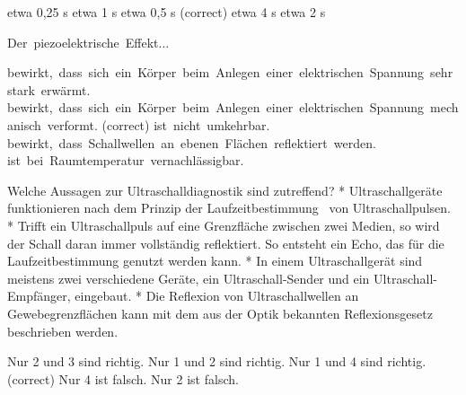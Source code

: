\documentclass[11pt]{exam}
\begin{document}
\begin{questions}
\begin{choices}
	\choice etwa 0,25 s
	\choice etwa 1 s
	\choice etwa 0,5 s (correct)
	\choice etwa 4 s
	\choice etwa 2 s
\end{choices}

\vspace{3mm}\question Der piezoelektrische Effekt...

\begin{choices}
	\choice bewirkt, dass sich ein Körper beim Anlegen einer elektrischen Spannung sehr stark erwärmt.
	\choice bewirkt, dass sich ein Körper beim Anlegen einer elektrischen Spannung mechanisch verformt. (correct)
	\choice ist nicht umkehrbar.
	\choice bewirkt, dass Schallwellen an ebenen Flächen reflektiert werden.
	\choice ist bei Raumtemperatur vernachlässigbar.
\end{choices}

\vspace{3mm}\question Welche Aussagen zur Ultraschalldiagnostik sind zutreffend?	* Ultraschallgeräte funktionieren nach dem Prinzip der Laufzeitbestimmung  von Ultraschallpulsen.	* Trifft ein Ultraschallpuls auf eine Grenzfläche zwischen zwei Medien, so wird der Schall daran immer vollständig reflektiert. So entsteht ein Echo, das für die Laufzeitbestimmung genutzt werden kann.	* In einem Ultraschallgerät sind meistens zwei verschiedene Geräte, ein Ultraschall-Sender und ein Ultraschall-Empfänger, eingebaut.	* Die Reflexion von Ultraschallwellen an Gewebegrenzflächen kann mit dem aus der Optik bekannten Reflexionsgesetz beschrieben werden.

\begin{choices}
	\choice Nur 2 und 3 sind richtig.
	\choice Nur 1 und 2 sind richtig.
	\choice Nur 1 und 4 sind richtig. (correct)
	\choice Nur 4 ist falsch.
	\choice Nur 2 ist falsch.
\end{choices}

\vspace{3mm}\end{questions}
\end{document}

